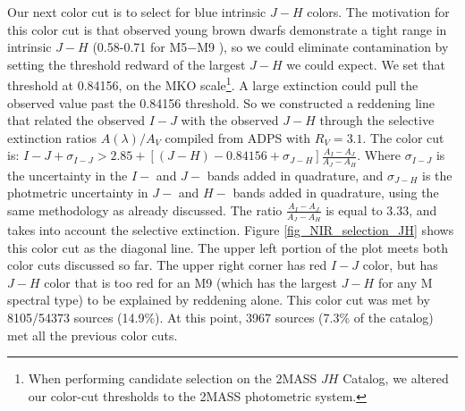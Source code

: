 Our next color cut is to select for blue intrinsic $J-H$ colors.  The motivation for this color cut is that observed young brown dwarfs demonstrate a tight range in intrinsic $J-H$ (0.58-0.71 for M5$-$M9 \citep{2010ApJS..186..111L}), so we could eliminate contamination by setting the threshold redward of the largest $J-H$ we could expect.  We set that threshold at 0.84156, on the MKO scale\footnote{When performing candidate selection on the 2MASS $JH$ Catalog, we altered our color-cut thresholds to the 2MASS photometric system.}.  A large extinction could pull the observed value past the 0.84156 threshold.  So we constructed a reddening line that related the observed $I-J$ with the observed $J-H$ through the selective extinction ratios $A(\lambda)/A_V$ compiled from ADPS \citep{2000A&AS..147..361M} with $R_V=3.1$.  The color cut is: $I-J + \sigma_{I-J} > 2.85 + [(J-H) - 0.84156 + \sigma_{J-H}]\frac{A_I-A_J}{A_J - A_H}$.  Where $\sigma_{I-J}$ is the uncertainty in the $I-$ and $J-$ bands added in quadrature, and $\sigma_{J-H}$ is the photmetric uncertainty in $J-$ and $H-$ bands added in quadrature, using the same methodology as already discussed.  The ratio $\frac{A_I-A_J}{A_J - A_H}$ is equal to 3.33, and takes into account the selective extinction.  Figure \ref{fig_NIR_selection_JH} shows this color cut as the diagonal line.  The upper left portion of the plot meets both color cuts discussed so far.  The upper right corner has red $I-J$ color, but has $J-H$ color that is too red for an M9 (which has the largest $J-H$ for any M spectral type) to be explained by reddening alone.  This color cut was met by 8105/54373 sources (14.9\%).  At this point, 3967 sources (7.3\% of the catalog) met all the previous color cuts.

